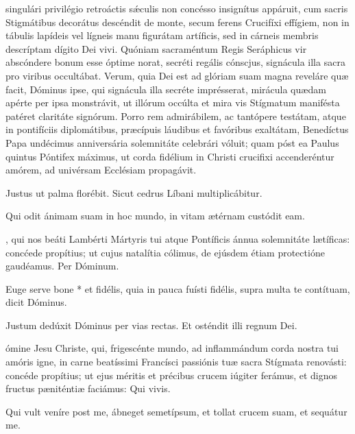 \documentclass[fontsize=9pt,paper=A6,twoside,BCOR=1mm,DIV=22,headinclude]{scrarticle}
\begin{document}
\begin{multicols}{2}
{
 singulári privilégio retroáctis s\'æculis non concésso insignítus appáruit, cum sacris Stigmátibus decorátus descéndit de monte, secum ferens Crucifíxi effígiem, non in tábulis lapídeis vel lígneis manu figurátam artíficis, sed in cárneis membris descríptam dígito Dei vivi. Quóniam sacraméntum Regis Seráphicus vir abscóndere bonum esse óptime norat, secréti regális cónscjus, signácula illa sacra pro viribus occultábat. Verum, quia Dei est ad glóriam suam magna reveláre quæ facit, Dóminus ipse, qui signácula illa secréte imprésserat, mirácula quædam apérte per ipsa monstrávit, ut illórum occúlta et mira vis Stígmatum manifésta patéret claritáte signórum. Porro rem admirábilem, ac tantópere testátam, atque in pontifíciis diplomátibus, præcípuis láudibus et favóribus exaltátam, Benedíctus Papa undécimus anniversária solemnitáte celebrári vóluit; quam póst ea Paulus quintus Póntifex máximus, ut corda fidélium in Christi crucifixi accenderéntur amórem, ad univérsam Ecclésiam propagávit.

\Te


\V Justus ut palma florébit.
\R Sicut cedrus Líbani multiplicábitur.

}

\B Qui odit ánimam suam in hoc mundo, in vitam ætérnam custódit eam.

, qui nos beáti Lambérti Mártyris tui atque Pontíficis ánnua solemnitáte lætíficas: concćede propítius; ut cujus natalítia cólimus, de ejúsdem étiam protectióne gaudéamus. Per Dóminum.


\A Euge serve bone * et fidélis, quia in pauca fuísti fidélis, supra multa te contítuam, dicit Dóminus.

\V Justum dedúxit Dóminus per vias rectas.
\R Et osténdit illi regnum Dei.


ómine Jesu Christe, qui, frigescénte mundo, ad inflammándum corda nostra tui amóris igne, in carne beatíssimi Francísci passiónis tuæ sacra Stígmata renovásti: concéde propítius; ut ejus méritis et précibus crucem iúgiter ferámus, et dignos fructus pæniténtiæ faciámus: Qui vivis.


\A Qui vult veníre post me, ábneget semetípsum, et tollat crucem suam, et sequátur me.


\end{multicols}
\end{document}
